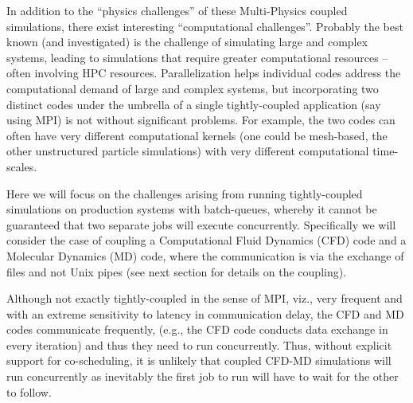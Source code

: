 \documentclass[conference,final]{IEEEtran}
\newcommand{\jhanote}[1]{ {\textcolor{red} { ***Jha: #1 }}}
\newcommand{\jhanote}[1]{}
\begin{document}
In addition to the ``physics challenges'' of these Multi-Physics
coupled simulations, there exist interesting ``computational
challenges''. Probably the best known (and investigated) is the
challenge of simulating large and complex systems, leading to
simulations that require greater computational resources -- often
involving HPC resources. %
Parallelization helps individual codes address the computational
demand of large and complex systems, but incorporating two distinct
codes under the umbrella of a single tightly-coupled application (say
using MPI) is not without significant problems. For example, the two
codes can often have very different computational kernels (one could
be mesh-based, the other unstructured particle simulations) with very
different computational time-scales.

Here we will focus on the challenges arising from running
tightly-coupled simulations on production systems with batch-queues,
whereby it cannot be guaranteed that two separate jobs will execute
concurrently. Specifically we will consider the case of coupling a
Computational Fluid Dynamics (CFD) code and a Molecular Dynamics (MD)
code, where the communication is via the exchange of files and not
Unix pipes (see next section for details on the coupling).


Although not exactly tightly-coupled in the sense of MPI, viz., very
frequent and with an extreme sensitivity to latency in communication
delay, the CFD and MD codes communicate frequently, (e.g., the CFD
code conducts data exchange in every iteration) and thus they need to
run concurrently. Thus, without explicit support for co-scheduling, it
is unlikely that coupled CFD-MD simulations will run concurrently as
inevitably the first job to run will have to wait for the other to
follow.

\end{document}

